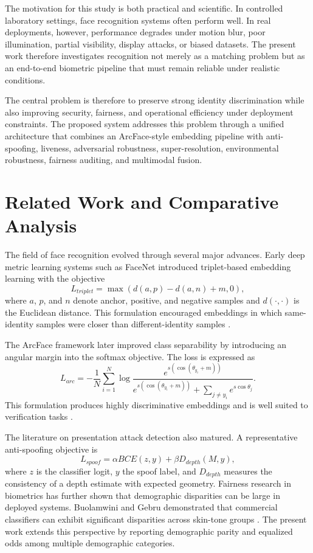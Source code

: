 \documentclass[conference]{IEEEtran}
\begin{document}
The motivation for this study is both practical and scientific. In controlled laboratory settings, face recognition systems often perform well. In real deployments, however, performance degrades under motion blur, poor illumination, partial visibility, display attacks, or biased datasets. The present work therefore investigates recognition not merely as a matching problem but as an end-to-end biometric pipeline that must remain reliable under realistic conditions.

The central problem is therefore to preserve strong identity discrimination while also improving security, fairness, and operational efficiency under deployment constraints. The proposed system addresses this problem through a unified architecture that combines an ArcFace-style embedding pipeline with anti-spoofing, liveness, adversarial robustness, super-resolution, environmental robustness, fairness auditing, and multimodal fusion.

\section{Related Work and Comparative Analysis}
The field of face recognition evolved through several major advances. Early deep metric learning systems such as FaceNet introduced triplet-based embedding learning with the objective
\begin{equation}
L_{triplet} = \max\left(d(a,p)-d(a,n)+m,0\right),
\end{equation}
where $a$, $p$, and $n$ denote anchor, positive, and negative samples and $d(\cdot,\cdot)$ is the Euclidean distance. This formulation encouraged embeddings in which same-identity samples were closer than different-identity samples \cite{schroff2015facenet}.

The ArcFace framework later improved class separability by introducing an angular margin into the softmax objective. The loss is expressed as
\begin{equation}
L_{arc} = -\frac{1}{N}\sum_{i=1}^{N}\log\frac{e^{s(\cos(\theta_{y_i}+m))}}{e^{s(\cos(\theta_{y_i}+m))}+\sum_{j\ne y_i}e^{s\cos\theta_j}}.
\end{equation}
This formulation produces highly discriminative embeddings and is well suited to verification tasks \cite{deng2019arcface}.

The literature on presentation attack detection also matured. A representative anti-spoofing objective is
\begin{equation}
L_{spoof}=\alpha BCE(z,y)+\beta D_{depth}(M,y),
\end{equation}
where $z$ is the classifier logit, $y$ the spoof label, and $D_{depth}$ measures the consistency of a depth estimate with expected geometry. Fairness research in biometrics has further shown that demographic disparities can be large in deployed systems. Buolamwini and Gebru demonstrated that commercial classifiers can exhibit significant disparities across skin-tone groups \cite{buolamwini2018gender}. The present work extends this perspective by reporting demographic parity and equalized odds among multiple demographic categories.
\end{document}
